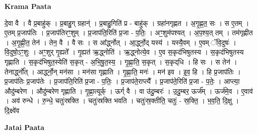 \documentclass[17pt]{extarticle}
\begin{document}
\textbf{Krama Paata} \newline

दे॒वा वै । वै प्र॒बाहु॑क् । प्र॒बाहु॒ग् ग्रहान्॑ । प्र॒बाहु॒गिति॑ प्र - बाहु॑क् । ग्रहा॑नगृह्णत । अ॒गृ॒ह्ण॒त॒ सः । स ए॒तम् । ए॒तम् प्र॒जाप॑तिः । प्र॒जाप॑तिरꣳ॒॒शुम् । प्र॒जाप॑ति॒रिति॑ प्र॒जा - प॒तिः॒ । अꣳ॒॒शुम॑पश्यत् । अ॒प॒श्य॒त् तम् । तम॑गृह्णीत । अ॒गृ॒ह्णी॒त॒ तेन॑ । तेन॒ वै । वै सः । स आ᳚र्द्ध्नोत् । आ॒र्द्ध्नो॒द् यस्य॑ । यस्यै॒वम् । ए॒वम् ॅवि॒दुषः॑ । वि॒दुषो॒ऽꣳ॒शुः । अꣳ॒॒शुर् गृ॒ह्यते᳚ । गृ॒ह्यत॑ ऋ॒द्ध्नोति॑ । ऋ॒द्ध्नोत्ये॒व । ए॒व स॒कृद॑भिषुतस्य । स॒कृद॑भिषुतस्य गृह्णाति । स॒कृद॑भिषुत॒स्येति॑ स॒कृत् - अ॒भि॒षु॒त॒स्य॒ । गृ॒ह्णा॒ति॒ स॒कृत् । स॒कृद्‌धि । हि सः । स तेन॑ । तेनार्द्ध्नो᳚त् । आर्द्ध्नो॒न् मन॑सा । मन॑सा गृह्णाति । गृ॒ह्णा॒ति॒ मनः॑ । मन॑ इव । इ॒व॒ हि । हि प्र॒जाप॑तिः । प्र॒जाप॑तिः प्र॒जाप॑तेः । प्र॒जाप॑ति॒रिति॑ प्र॒जा - प॒तिः॒ । प्र॒जाप॑ते॒राप्त्यै᳚ । प्र॒जाप॑ते॒रिति॑ प्र॒जा - प॒तेः॒ । आप्त्या॒ औदु॑म्बरेण । औदु॑म्बरेण गृह्णाति । गृ॒ह्णा॒त्यूर्क् । ऊर्ग् वै । वा उ॑दु॒म्बरः॑ । उ॒दु॒म्बर॒ ऊर्ज᳚म् । ऊर्ज॑मे॒व । ए॒वाव॑ । अव॑ रुन्धे । रु॒न्धे॒ चतुः॑स्रक्ति । चतुः॑स्रक्ति भवति । चतुः॑स्र॒क्तीति॒ चतुः॑ - स्र॒क्ति॒ । भ॒व॒ति॒ दि॒क्षु । दि॒क्ष्वे॑व \newline

\textbf{Jatai Paata} \newline
\end{document}
